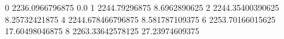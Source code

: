 0 2236.0966796875 0.0
1 2244.79296875 8.6962890625
2 2244.35400390625 8.25732421875
4 2244.678466796875 8.581787109375
6 2253.70166015625 17.60498046875
8 2263.33642578125 27.23974609375
